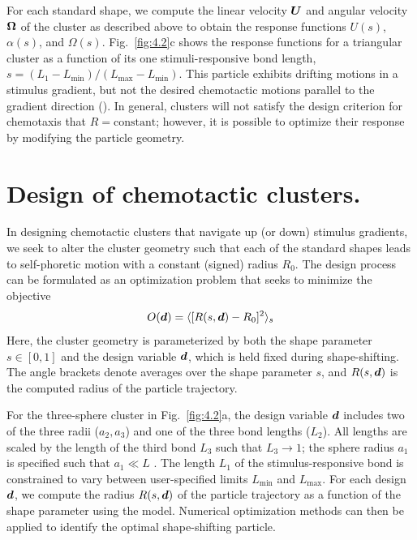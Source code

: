 For each standard shape, we compute the linear velocity $\boldsymbol{U}$ and angular velocity $\boldsymbol{\Omega}$ of the cluster as described above to obtain the response functions $U(s)$, $\alpha(s)$, and $\Omega(s)$. Fig.\ \ref{fig:4.2}c shows the response functions for a triangular cluster as a function of its one stimuli-responsive bond length, $s = (L_1 - L_{\min})/(L_{\max}-L_{\min})$.  This particle exhibits drifting motions in a stimulus gradient, but not the desired chemotactic motions parallel to the gradient direction ().  In general, clusters will not satisfy the design criterion for chemotaxis that $R=\text{constant}$; however, it is possible to optimize their response by modifying the particle geometry.

\section{Design of chemotactic clusters.} In designing chemotactic clusters that navigate up (or down) stimulus gradients, we seek to alter the cluster geometry such that each of the standard shapes leads to self-phoretic motion with a constant (signed) radius $R_0$. The design process can be formulated as an optimization problem that seeks to minimize the objective
\begin{equation}
    O(\boldsymbol{d}) = \langle [R(s,\boldsymbol{d})-R_0]^2 \rangle_s
\end{equation}
Here, the cluster geometry is parameterized by both the shape parameter $s\in[0,1]$ and the design variable $\boldsymbol{d}$, which is held fixed during shape-shifting.  The angle brackets denote averages over the shape parameter $s$, and $R(s,\boldsymbol{d})$ is the computed radius of the particle trajectory.

For the three-sphere cluster in Fig.\ \ref{fig:4.2}a, the design variable $\boldsymbol{d}$ includes two of the three radii ($a_2,a_3$) and one of the three bond lengths ($L_2$). All lengths are scaled by the length of the third bond $L_3$ such that $L_3\rightarrow 1$; the sphere radius $a_1$ is specified such that $a_1\ll L$ . The length $L_1$ of the stimulus-responsive bond is constrained to vary between user-specified limits $L_{\min}$ and $L_{\max}$. For each design $\boldsymbol{d}$, we compute the radius $R(s,\boldsymbol{d})$ of the particle trajectory as a function of the shape parameter using the model.  Numerical optimization methods can then be applied to identify the optimal shape-shifting particle.

